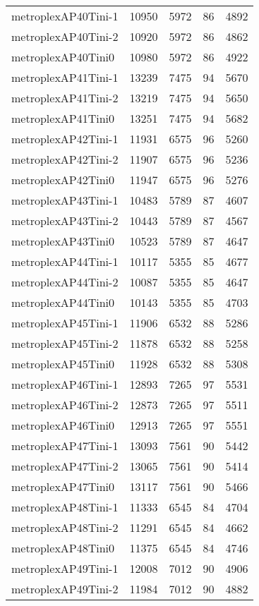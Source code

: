 \begin{longtable}{lrrrr}
metroplexAP40Tini-1 & 10950 & 5972 & 86 & 4892 \\
metroplexAP40Tini-2 & 10920 & 5972 & 86 & 4862 \\
metroplexAP40Tini0 & 10980 & 5972 & 86 & 4922 \\
metroplexAP41Tini-1 & 13239 & 7475 & 94 & 5670 \\
metroplexAP41Tini-2 & 13219 & 7475 & 94 & 5650 \\
metroplexAP41Tini0 & 13251 & 7475 & 94 & 5682 \\
metroplexAP42Tini-1 & 11931 & 6575 & 96 & 5260 \\
metroplexAP42Tini-2 & 11907 & 6575 & 96 & 5236 \\
metroplexAP42Tini0 & 11947 & 6575 & 96 & 5276 \\
metroplexAP43Tini-1 & 10483 & 5789 & 87 & 4607 \\
metroplexAP43Tini-2 & 10443 & 5789 & 87 & 4567 \\
metroplexAP43Tini0 & 10523 & 5789 & 87 & 4647 \\
metroplexAP44Tini-1 & 10117 & 5355 & 85 & 4677 \\
metroplexAP44Tini-2 & 10087 & 5355 & 85 & 4647 \\
metroplexAP44Tini0 & 10143 & 5355 & 85 & 4703 \\
metroplexAP45Tini-1 & 11906 & 6532 & 88 & 5286 \\
metroplexAP45Tini-2 & 11878 & 6532 & 88 & 5258 \\
metroplexAP45Tini0 & 11928 & 6532 & 88 & 5308 \\
metroplexAP46Tini-1 & 12893 & 7265 & 97 & 5531 \\
metroplexAP46Tini-2 & 12873 & 7265 & 97 & 5511 \\
metroplexAP46Tini0 & 12913 & 7265 & 97 & 5551 \\
metroplexAP47Tini-1 & 13093 & 7561 & 90 & 5442 \\
metroplexAP47Tini-2 & 13065 & 7561 & 90 & 5414 \\
metroplexAP47Tini0 & 13117 & 7561 & 90 & 5466 \\
metroplexAP48Tini-1 & 11333 & 6545 & 84 & 4704 \\
metroplexAP48Tini-2 & 11291 & 6545 & 84 & 4662 \\
metroplexAP48Tini0 & 11375 & 6545 & 84 & 4746 \\
metroplexAP49Tini-1 & 12008 & 7012 & 90 & 4906 \\
metroplexAP49Tini-2 & 11984 & 7012 & 90 & 4882 \\

\end{longtable}
